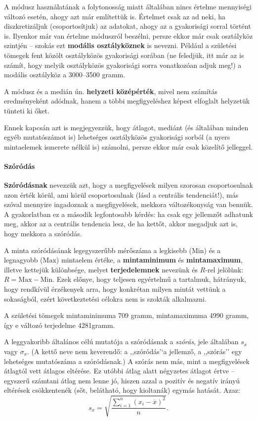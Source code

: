 \documentclass[]{book}
\let\oldparagraph\paragraph
\renewcommand{\paragraph}[1]{\oldparagraph{#1}\mbox{}}
\begin{document}
A módusz használatának a folytonosság miatt általában nincs értelme
mennyiségi változó esetén, ahogy azt már említettük is. Értelmet csak az
ad neki, ha diszkretizáljuk (csoportosítjuk) az adatokat, ahogy az a
gyakorisági sorral történt is. Ilyenkor már van értelme móduszról
beszélni, persze ekkor már csak osztályköz szintjén -- szokás ezt
\textbf{modális osztályköznek} is nevezni. Például a születési tömegek
fent közölt osztályközös gyakorisági sorában (ne feledjük, itt már az is
számít, hogy melyik osztályközös gyakorisági sorra vonatkozóan adjuk
meg!) a modális osztályköz a 3000--3500 gramm.

A módusz és a medián ún. \textbf{helyzeti középérték}, mivel nem
számítás eredményeként adódnak, hanem a többi megfigyeléshez képest
elfoglalt helyzetük tünteti ki őket.

Ennek kapcsán azt is megjegyezzük, hogy átlagot, mediánt (és általában
minden egyéb mutatószámot is) lehetséges osztályközös gyakorisági sorból
(a nyers mintaelemek ismerete nélkül is) számolni, persze ekkor már csak
közelítő jelleggel.

\paragraph{Szóródás}\label{deskriptivmennyegyvaltanalitikusmutatoszamokszorodas}

\textbf{Szóródásnak} nevezzük azt, hogy a megfigyelések milyen szorosan
csoportosulnak azon érték körül, ami körül csoportosulnak (lásd a
centrális tendenciát!), más szóval mennyire ingadoznak a megfigyelések,
mekkora változékonyság van bennük. A gyakorlatban ez a második
legfontosabb kérdés: ha csak egy jellemzőt adhatunk meg, akkor az a
centrális tendencia lesz, de ha kettőt, akkor megadjuk azt is, hogy
mekkora a szóródás.

A minta szóródásának legegyszerűbb mérőszáma a legkisebb
(\(\mathrm{Min}\)) és a legnagyobb (\(\mathrm{Max}\)) mintaelem értéke,
a \textbf{mintaminimum} és \textbf{mintamaximum}, illetve kettejük
különbsége, melyet \textbf{terjedelemnek} nevezünk és \(R\)-rel
jelölünk: \(R=\mathrm{Max}-\mathrm{Min}\). Ezek előnye, hogy teljesen
egyértelmű a tartalmuk, hátrányuk, hogy rendkívül érzékenyek arra, hogy
konkrétan milyen mintát vettünk a sokaságból, ezért következtetési
célokra nem is szokták alkalmazni.

A születési tömegek mintaminimuma 709 gramm, mintamaximuma 4990 gramm,
így e változó terjedelme 4281gramm.

A leggyakoribb általános célú mutatója a szóródásnak a \emph{szórás},
jele általában \(s_x\) vagy \(\sigma_x\). (A kettő neve nem keverendő: a
,,szóródás'`a jellemző, a ,,szórás'' egy lehetséges mutatószáma a
szóródásnak.) A szórás nem más, mint a megfigyelések átlagtól vett
átlagos eltérése. Ez utóbbi átlag alatt négyzetes átlagot értve --
egyszerű számtani átlag nem lenne jó, hiszen azzal a pozitív és negatív
irányú eltérések csökkentenék (sőt, belátható, hogy kioltanák) egymás
hatását. Azaz: \[
    s_x=\sqrt{\frac{\sum_{i=1}^n \left(x_i-\overline{x}\right)^2}{n}}.
\]
\end{document}
